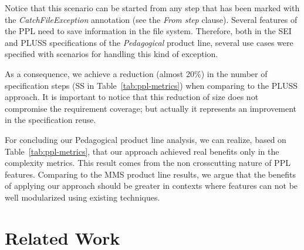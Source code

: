 \documentclass{acm_proc_article-sp}
\begin{document}
    
Notice that this scenario can be started from any step that has been marked with
the \emph{CatchFileException} annotation (see the \emph{From step} clause).
Several features of the PPL need to save information in the file system.
Therefore, both in the SEI and PLUSS specifications of the \emph{Pedagogical}
product line, several use cases were specified with scenarios for handling this
kind of exception.

As a consequence, we achieve a reduction (almost 20\%) in the number of
specification steps (SS in Table~\ref{tab:ppl-metrics}) when comparing to the
PLUSS approach. It is important to notice that this reduction of size does not
compromise the requirement coverage; but actually it represents an improvement in
the specification reuse.

For concluding our Pedagogical product line analysis, we can realize, based on
Table~\ref{tab:ppl-metrics}, that our approach achieved real benefits only in the
complexity metrics. This result comes from the non crosscutting nature of PPL
features. Comparing to the MMS product line results, we argue that the benefits
of applying our approach should be greater in contexts where features can not be
well modularized using existing techniques.
   
\section{Related Work}
\label{sec:related}
\end{document}
